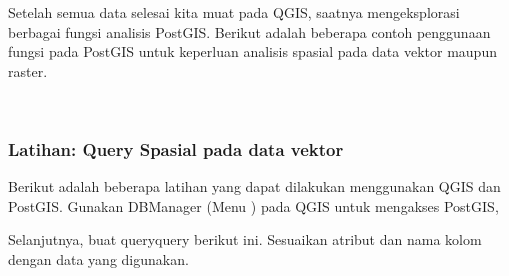 \documentclass[letterpaper,10pt,english]{sphinxmanual}
\begin{document}
Setelah semua data selesai kita muat pada QGIS, saatnya meng\sphinxhyphen{}eksplorasi berbagai fungsi analisis PostGIS. Berikut adalah beberapa contoh penggunaan fungsi pada PostGIS untuk keperluan analisis spasial pada data vektor maupun raster.

 


\subsubsection{Latihan: Query Spasial pada data vektor}
\label{\detokenize{sesi2/postgisquery:latihan-query-spasial-pada-data-vektor}}
Berikut adalah beberapa latihan yang dapat dilakukan menggunakan QGIS dan PostGIS. Gunakan DBManager (Menu ) pada QGIS untuk mengakses PostGIS,

Selanjutnya, buat query\sphinxhyphen{}query berikut ini. Sesuaikan atribut dan nama kolom dengan data yang digunakan.
\end{document}
